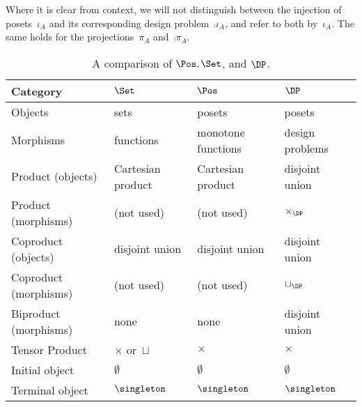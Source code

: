 \begin{remark}Where it is clear from context, we will not distinguish between the injection of posets~$\iota_A$ and its corresponding design problem~$\comp{\iota_A}$, and refer to both by~$\iota_A$. The same holds for the projections~$\pi_A$ and~$\comp{\pi_A}$.
\end{remark}

\begin{table}[b]
\begin{small}
\begin{center}
\begin{tabular}{llll}
    Category&$\Set$&$\Pos$&$\DP$\\
    \hline
    Objects&sets&posets&posets\\
    Morphisms &functions&monotone functions&design problems\\
    Product (objects) &Cartesian product& Cartesian product& disjoint union\\
    Product (morphisms) &(not used)&(not used)&$\times_\DP$\\
    Coproduct (objects) &disjoint union&disjoint union&disjoint union\\
    Coproduct (morphisms) &(not used)&(not used)&$\sqcup_\DP$\\
    Biproduct (morphisms)& none&none& disjoint union\\
    Tensor Product &$\times$ or~$\sqcup$&$\times$&$\times$\\
    Initial object &$\emptyset$&$\emptyset$&$\emptyset$\\
    Terminal object &$\singleton$&$\singleton$&$\singleton$
\end{tabular}
\end{center}
\end{small}
\caption{A comparison of $\Pos, \Set$, and $\DP$.}
\end{table}

